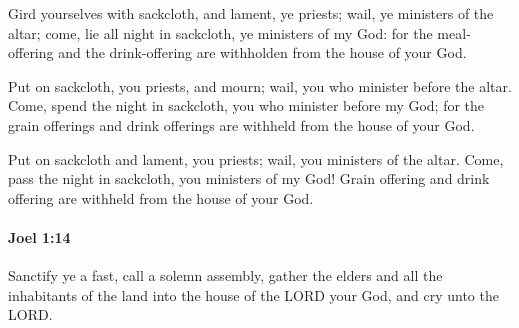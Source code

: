 			\begin{versebox}
					\item[BHS] 
					\item[LXX] 
					\item[ASV] Gird yourselves with sackcloth, and lament, ye priests; wail, ye ministers of the altar; come, lie all night in sackcloth, ye ministers of my God: for the meal-offering and the drink-offering are withholden from the house of your God.
					\item[NIV] Put on sackcloth, you priests, and mourn; wail, you who minister before the altar. Come, spend the night in sackcloth, you who minister before my God; for the grain offerings and drink offerings are withheld from the house of your God.
					\item[NRSV] Put on sackcloth and lament, you priests; wail, you ministers of the altar. Come, pass the night in sackcloth, you ministers of my God! Grain offering and drink offering are withheld from the house of your God.
			\end{versebox}

		\paragraph{Joel 1:14} %
			\label{JOEL-1-14}

			Sanctify ye a fast, call a solemn assembly, gather the elders and all the inhabitants of the land into the house of the LORD your God, and cry unto the LORD.

